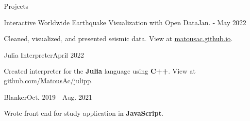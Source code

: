 \begin{rSection}{Projects}
	\begin{project}{Interactive Worldwide Earthquake Visualization with Open Data}{Jan. - May 2022}{}{}
		\item Cleaned, visualized, and presented seismic data. View at \href{https://matousac.github.io/}{matousac.github.io}.
	\end{project}
	\begin{project}{Julia Interpreter}{April 2022}{}{}
		\item Created interpreter for the {\bf Julia} language using {\bf C++}. View at \href{https://github.com/MatousAc/julipp}{github.com/MatousAc/julipp}.
	\end{project}
	\begin{project}{Blanker}{Oct. 2019 - Aug. 2021}{}{}
		\item Wrote front-end for study application in {\bf JavaScript}.
	\end{project}
\end{rSection}